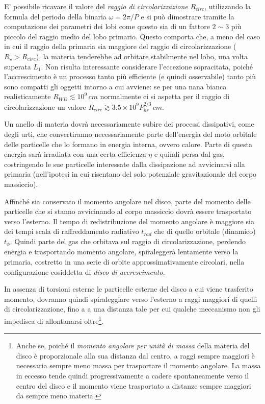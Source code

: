 \documentclass[a4paperbi]{article}
\begin{document}
	E' possibile ricavare il valore del \textit{raggio di circolarizzazione} $R_{circ}$, utilizzando la formula del periodo della binaria $\omega=2\pi/P$ e si può dimostrare tramite la computazione dei parametri dei lobi come questo sia di un fattore $2\sim3$ più piccolo del raggio medio del lobo primario. Questo comporta che, a meno del caso in cui il raggio della primaria sia maggiore del raggio di circolarizzazione ($R_\star>R_{circ}$), la materia tenderebbe ad orbitare stabilmente nel lobo, una volta superata $L_1$.
	Non risulta interessante considerare l'eccezione sopracitata, poiché l'accrescimento è un processo tanto più efficiente (e quindi osservabile) tanto più sono compatti gli oggetti intorno a cui avviene: se per una nana bianca realisticamente $R_{WD}\lesssim10^9\,cm$ normalmente ci si aspetta per il raggio di circolarizzazione un valore $R_{circ}\gtrsim3.5\times10^9P_{hr}^{2/3}\,cm$.

	Un anello di materia dovrà necessariamente subire dei processi dissipativi, come degli urti, che convertiranno necessariamente parte dell'energia del moto orbitale delle particelle che lo formano in energia interna, ovvero calore. Parte di questa energia sarà irradiata con una certa efficienza $\eta$ e quindi persa dal gas, costringendo le sue particelle interessate dalla dissipazione ad avvicinarsi alla primaria (nell'ipotesi in cui risentano del solo potenziale gravitazionale del corpo massiccio). 
	
	Affinché sia conservato il momento angolare nel disco, parte del momento delle particelle che si stanno avvicinando al corpo massiccio dovrà essere trasportato verso l'esterno. Il tempo di redistribuzione del momento angolare è maggiore sia dei tempi scala di raffreddamento radiativo $t_{rad}$ che di quello orbitale (dinamico) $t_{\phi}$. Quindi parte del gas che orbitava sul raggio di circolarizzazione, perdendo energia e trasportando momento angolare, spiraleggerà lentamente verso la primaria, costretto in una serie di orbite approssimativamente circolari, nella configurazione cosiddetta di \textit{disco di accrescimento}. 	
	
	In assenza di torsioni esterne le particelle esterne del disco a cui viene trasferito momento, dovranno quindi spiraleggiare verso l'esterno a raggi maggiori di quelli di circolarizzazione, fino a a una distanza tale per cui qualche meccanismo non gli impedisca di allontanarsi oltre\footnote{Anche se, poiché il \textit{momento angolare per unità di massa} della materia del disco è proporzionale alla sua distanza dal centro, a raggi sempre maggiori è necessaria sempre meno massa per trasportare il momento angolare. La massa in eccesso tende quindi progressivamente a cadere spontaneamente verso il centro del disco e il momento viene trasportato a distanze sempre maggiori da sempre meno materia.}.
		
\end{document}

